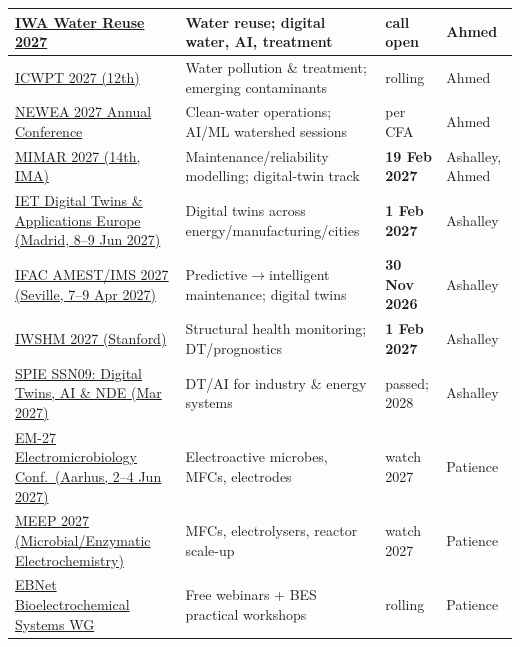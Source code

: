 \documentclass[11pt,a4paper]{article}
\begin{document}
\begin{longtable}{@{}p{3.4cm}p{5.6cm}p{2.2cm}p{2.7cm}@{}}
\midrule
\href{https://www.awa.asn.au/iwareuse2027/call-for-abstracts}{IWA Water Reuse 2027} & Water reuse; digital water, AI, treatment & call open & Ahmed \\
\midrule
\href{https://www.icwpt.net/cfp.html}{ICWPT 2027 (12th)} & Water pollution \& treatment; emerging contaminants & rolling & Ahmed \\
\midrule
\href{https://www.newea.org/wp-content/uploads/2026/04/AC27_CFA-1.pdf}{NEWEA 2027 Annual Conference} & Clean-water operations; AI/ML watershed sessions & per CFA & Ahmed \\
\midrule
\href{https://ima.org.uk/29258/14th-ima-international-conference-on-modelling-in-industrial-maintenance-and-reliability-mimar2027/}{MIMAR 2027 (14th, IMA)} & Maintenance/reliability modelling; digital-twin track & \textbf{19 Feb 2027} & Ashalley, Ahmed \\
\midrule
\href{https://digitaltwins.theiet.org/dta-europe-2027}{IET Digital Twins \& Applications Europe (Madrid, 8--9 Jun 2027)} & Digital twins across energy/manufacturing/cities & \textbf{1 Feb 2027} & Ashalley \\
\midrule
\href{https://www.linkedin.com/posts/digest-pn-6727052b0_callforpapers-ifac-amest2027-ims-2027-activity-7502622229021499393-pJOU}{IFAC AMEST/IMS 2027 (Seville, 7--9 Apr 2027)} & Predictive$\rightarrow$intelligent maintenance; digital twins & \textbf{30 Nov 2026} & Ashalley \\
\midrule
\href{https://iwshm2027.stanford.edu/call_for_paper}{IWSHM 2027 (Stanford)} & Structural health monitoring; DT/prognostics & \textbf{1 Feb 2027} & Ashalley \\
\midrule
\href{https://spie.org/SS27/conferencedetails/digital-twins-ai-nde-for-industry-applications-and-energy-systems}{SPIE SSN09: Digital Twins, AI \& NDE (Mar 2027)} & DT/AI for industry \& energy systems & passed; 2028 & Ashalley \\
\midrule
\href{https://conferences.au.dk/electromicrobiology-2027}{EM-27 Electromicrobiology Conf.\ (Aarhus, 2--4 Jun 2027)} & Electroactive microbes, MFCs, electrodes & watch 2027 & Patience \\
\midrule
\href{https://www.i-meep.com/2027}{MEEP 2027 (Microbial/Enzymatic Electrochemistry)} & MFCs, electrolysers, reactor scale-up & watch 2027 & Patience \\
\midrule
\href{https://ebnet.ac.uk/wg-details/wg-bes/}{EBNet Bioelectrochemical Systems WG} & Free webinars $+$ BES practical workshops & rolling & Patience \\

\end{longtable}
\end{document}

